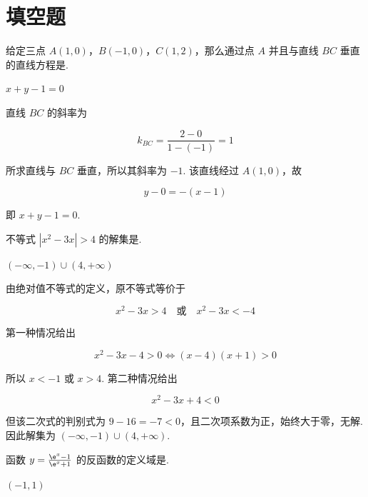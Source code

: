 \section{填空题}

\begin{problem}
给定三点 \(A(1,0)\)，\(B(-1,0)\)，\(C(1,2)\)，那么通过点 \(A\) 并且与直线 \(BC\) 垂直的直线方程是\fillinblank{}.
\end{problem}

\begin{answer}
\(x+y-1=0\)
\end{answer}

\begin{solution}
直线 \(BC\) 的斜率为

\[k_{BC}=\frac{2-0}{1-(-1)}=1\]

所求直线与 \(BC\) 垂直，所以其斜率为 \(-1\). 该直线经过 \(A(1,0)\)，故

\[y-0=-(x-1)\]

即 \(x+y-1=0\).
\end{solution}

\begin{problem}
不等式 \(|x^2 - 3x| > 4\) 的解集是\fillinblank{}.
\end{problem}

\begin{answer}
\(\left(-\infty,-1\right)\cup\left(4,+\infty\right)\)
\end{answer}

\begin{solution}
由绝对值不等式的定义，原不等式等价于

\[x^2-3x>4\quad\text{或}\quad x^2-3x<-4\]

第一种情况给出

\[x^2-3x-4>0\Longleftrightarrow (x-4)(x+1)>0\]

所以 \(x<-1\) 或 \(x>4\). 第二种情况给出

\[x^2-3x+4<0\]

但该二次式的判别式为 \(9-16=-7<0\)，且二次项系数为正，始终大于零，无解. 因此解集为 \(\left(-\infty,-1\right)\cup\left(4,+\infty\right)\).
\end{solution}

\begin{problem}
函数 \(y = \frac{\e^x - 1}{\e^x + 1}\) 的反函数的定义域是\fillinblank{}.
\end{problem}

\begin{answer}
\(\left(-1,1\right)\)
\end{answer}

